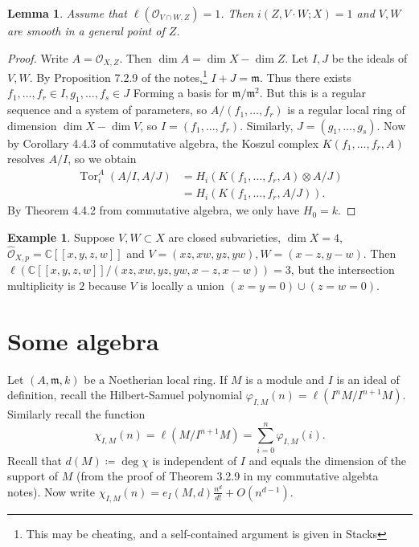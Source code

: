 \documentclass[leqno, openany]{memoir}
\newtheorem{lem}[thm]{Lemma}
\theoremstyle{definition}
\newtheorem{exm}[thm]{Example}
\theoremstyle{remark}
\theoremstyle{plain}
\theoremstyle{definition}
\theoremstyle{remark}
\newcommand{\C}{\mathbb{C}}
\newcommand{\mc}[1]{\mathcal{#1}}
\newcommand{\mf}[1]{\mathfrak{#1}}
\newcommand{\wh}[1]{\widehat{#1}}
\DeclareMathOperator{\Tor}{Tor}
\begin{document}
\begin{lem}
    Assume that $\ell(\mc{O}_{V \cap W, Z}) = 1$. Then $i(Z, V \cdot W; X) = 1$ and $V, W$ are smooth in a general point of $Z$.
\end{lem}

\begin{proof}
    Write $A = \mc{O}_{X,Z}$. Then $\dim A = \dim X - \dim Z$. Let $I, J$ be the ideals of $V, W$. By Proposition 7.2.9 of the notes,\footnote{This may be cheating, and a self-contained argument is given in Stacks} $I + J = \mf{m}$. Thus there exists $f_1, \ldots, f_r \in I , g_1, \ldots, f_s \in J$ Forming a basis for $\mf{m}/\mf{m}^2$. But this is a regular sequence and a system of parameters, so $A/ (f_1, \ldots, f_r)$ is a regular local ring of dimension $\dim X - \dim V$, so $I = (f_1, \ldots, f_r)$. Similarly, $J = (g_1, \ldots, g_s)$. Now by Corollary 4.4.3 of commutative algebra, the Koszul complex $K(f_1, \ldots, f_r, A)$ resolves $A/I$, so we obtain
    \begin{align*}
        \Tor_i^A(A/I, A/J) &= H_i (K(f_1, \ldots, f_r, A) \otimes A/J) \\
                           &= H_i (K(f_1, \ldots, f_r, A/J)).
    \end{align*}
    By Theorem 4.4.2 from commutative algebra, we only have $H_0 = k$.
\end{proof}

\begin{exm}
    Suppose $V, W \subset X$ are closed subvarieties, $\dim X = 4$, $\wh{\mc{O}}_{X,p} = \C[[x,y,z,w]]$ and $V = (xz,xw,yz,yw), W = (x-z,y-w)$. Then $\ell(\C[[x,y,z,w]]/(xz,xw,yz,yw,x-z,x-w)) = 3$, but the intersection multiplicity is $2$ because $V$ is locally a union $(x=y=0) \cup (z=w=0)$.
\end{exm}

\section{Some algebra}%
\label{sec:some_algebra}

Let $(A, \mf{m}, k)$ be a Noetherian local ring. If $M$ is a module and $I$ is an ideal of definition, recall the Hilbert-Samuel polynomial $\varphi_{I,M}(n) = \ell(I^n M / I^{n+1} M)$. Similarly recall the function 
\[ \chi_{I,M}(n) = \ell(M/I^{n+1} M) = \sum_{i=0}^n \varphi_{I,M}(i). \]
Recall that $d(M) \coloneqq \deg \chi$ is independent of $I$ and equals the dimension of the support of $M$ (from the proof of Theorem 3.2.9 in my commutative algebta notes). Now write $\chi_{I,M}(n) = e_I(M, d) \frac{n^d}{d!} + O(n^{d-1})$.
\end{document}
